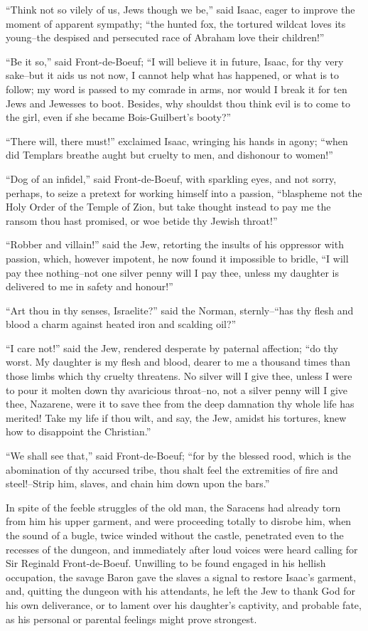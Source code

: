 ``Think not so vilely of us, Jews though we be,'' said Isaac, eager to
improve the moment of apparent sympathy; ``the hunted fox, the tortured
wildcat loves its young--the despised and persecuted race of Abraham
love their children!''

``Be it so,'' said Front-de-Boeuf; ``I will believe it in future, Isaac,
for thy very sake--but it aids us not now, I cannot help what has
happened, or what is to follow; my word is passed to my comrade in arms,
nor would I break it for ten Jews and Jewesses to boot. Besides, why
shouldst thou think evil is to come to the girl, even if she became
Bois-Guilbert's booty?''

``There will, there must!'' exclaimed Isaac, wringing his hands in
agony; ``when did Templars breathe aught but cruelty to men, and
dishonour to women!''

``Dog of an infidel,'' said Front-de-Boeuf, with sparkling eyes, and not
sorry, perhaps, to seize a pretext for working himself into a passion,
``blaspheme not the Holy Order of the Temple of Zion, but take thought
instead to pay me the ransom thou hast promised, or woe betide thy
Jewish throat!''

``Robber and villain!'' said the Jew, retorting the insults of his
oppressor with passion, which, however impotent, he now found it
impossible to bridle, ``I will pay thee nothing--not one silver penny
will I pay thee, unless my daughter is delivered to me in safety and
honour!''

``Art thou in thy senses, Israelite?'' said the Norman, sternly--``has
thy flesh and blood a charm against heated iron and scalding oil?''

``I care not!'' said the Jew, rendered desperate by paternal affection;
``do thy worst. My daughter is my flesh and blood, dearer to me a
thousand times than those limbs which thy cruelty threatens. No silver
will I give thee, unless I were to pour it molten down thy avaricious
throat--no, not a silver penny will I give thee, Nazarene, were it to
save thee from the deep damnation thy whole life has merited! Take my
life if thou wilt, and say, the Jew, amidst his tortures, knew how to
disappoint the Christian.''

``We shall see that,'' said Front-de-Boeuf; ``for by the blessed rood,
which is the abomination of thy accursed tribe, thou shalt feel the
extremities of fire and steel!--Strip him, slaves, and chain him down
upon the bars.''

In spite of the feeble struggles of the old man, the Saracens had
already torn from him his upper garment, and were proceeding totally to
disrobe him, when the sound of a bugle, twice winded without the castle,
penetrated even to the recesses of the dungeon, and immediately after
loud voices were heard calling for Sir Reginald Front-de-Boeuf.
Unwilling to be found engaged in his hellish occupation, the savage
Baron gave the slaves a signal to restore Isaac's garment, and, quitting
the dungeon with his attendants, he left the Jew to thank God for his
own deliverance, or to lament over his daughter's captivity, and
probable fate, as his personal or parental feelings might prove
strongest.
